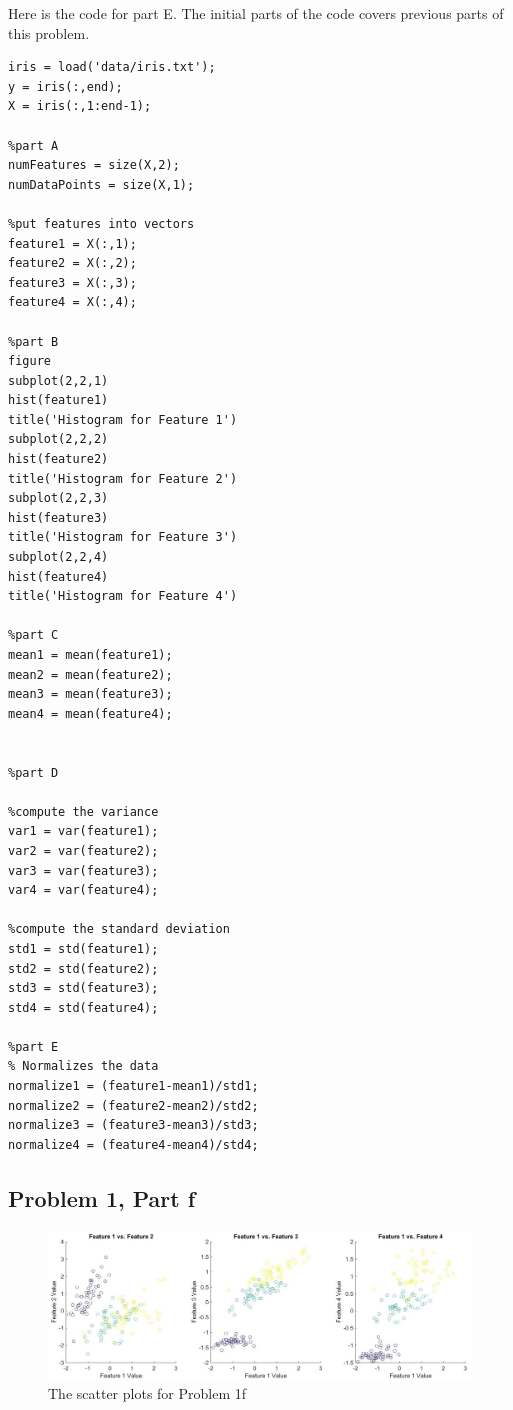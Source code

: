 \documentclass[11pt,psfig]{article}
\begin{document}
Here is the code for part E. The initial parts of the code covers previous parts of this problem. 
\begin{verbatim}
iris = load('data/iris.txt');
y = iris(:,end);
X = iris(:,1:end-1);

%part A
numFeatures = size(X,2);
numDataPoints = size(X,1);

%put features into vectors
feature1 = X(:,1);
feature2 = X(:,2);
feature3 = X(:,3);
feature4 = X(:,4);

%part B
figure
subplot(2,2,1)
hist(feature1)
title('Histogram for Feature 1')
subplot(2,2,2)
hist(feature2)
title('Histogram for Feature 2')
subplot(2,2,3)
hist(feature3)
title('Histogram for Feature 3')
subplot(2,2,4)
hist(feature4)
title('Histogram for Feature 4')

%part C
mean1 = mean(feature1);
mean2 = mean(feature2);
mean3 = mean(feature3);
mean4 = mean(feature4);


%part D

%compute the variance
var1 = var(feature1);
var2 = var(feature2);
var3 = var(feature3);
var4 = var(feature4);

%compute the standard deviation
std1 = std(feature1);
std2 = std(feature2);
std3 = std(feature3);
std4 = std(feature4);

%part E
% Normalizes the data
normalize1 = (feature1-mean1)/std1;
normalize2 = (feature2-mean2)/std2;
normalize3 = (feature3-mean3)/std3;
normalize4 = (feature4-mean4)/std4;

\end{verbatim}

\subsection*{Problem 1, Part f}

\begin{figure}[H]
\centering
\includegraphics[width=\columnwidth]{prob1fScatterPlots.jpg}
\caption{The scatter plots for Problem 1f}
\end{figure}
\end{document}
